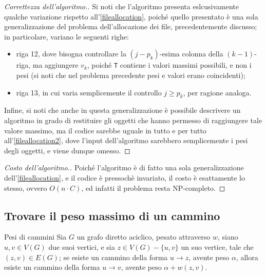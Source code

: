 \documentclass[a4paper, 12pt]{report}
\begin{document}
    \begin{proof}[Correttezza dell'algoritmo.]
        Si noti che l'algoritmo presenta eslcusivamente qualche variazione rispetto all'\cref{fileallocation}, poiché quello presentato è una sola generalizzazione del problema dell'allocazione dei file, precedentemente discusso; in particolare, variano le seguenti righe:

        \begin{itemize}
            \item riga 12, dove bisogna controllare la $(j - p_k)$-esima colonna della $(k -1)$-riga, ma aggiungere $v_k$, poiché \texttt{T} contiene i valori massimi possibili, e non i pesi (si noti che nel problema precedente pesi e valori erano coincidenti);
            \item riga 13, in cui varia semplicemente il controllo $j \ge p_k$, per ragione analoga.
        \end{itemize}

        Infine, si noti che anche in questa generalizzazione è possibile descrivere un algoritmo in grado di restituire gli oggetti che hanno permesso di raggiungere tale valore massimo, ma il codice sarebbe uguale in tutto e per tutto all'\cref{fileallocation2}, dove l'input dell'algoritmo sarebbero semplicemente i pesi degli oggetti, e viene dunque omesso.
    \end{proof}

    \begin{proof}[Costo dell'algoritmo.]
        Poiché l'algoritmo è di fatto una sola generalizzazione dell'\cref{fileallocation}, e il codice è pressochè invariato, il costo è esattamente lo stesso, ovvero $O(n \cdot C)$, ed infatti il problema resta NP-completo.
    \end{proof}

    \subsection{Trovare il peso massimo di un cammino}

    \begin{framedlem}[label={lemma grafi max}]{Pesi di cammini}
        Sia $G$ un grafo diretto aciclico, pesato attraverso $w$, siano $u, v \in V(G)$ due suoi vertici, e sia $z \in V(G) - \{u, v\}$ un suo vertice, tale che $(z, v) \in E(G)$; se esiste un cammino della forma $u \rightarrow z$, avente peso $\alpha$, allora esiste un cammino della forma $u \rightarrow v$, avente peso $\alpha + w(z, v)$.
    \end{framedlem}
\end{document}

